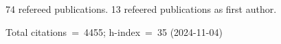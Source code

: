 74 refereed publications. 13 refeered publications as first author.

Total citations~=~4455; h-index~=~35 (2024-11-04)